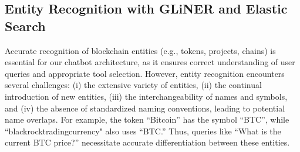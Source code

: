 \documentclass[runningheads]{llncs}
\begin{document}



\subsection{Entity Recognition with GLiNER and Elastic Search}

Accurate recognition of blockchain entities (e.g., tokens, projects, chains) is essential for our chatbot architecture, as it ensures correct understanding of user queries and appropriate tool selection. However, entity recognition encounters several challenges: (i) the extensive variety of entities, (ii) the continual introduction of new entities, (iii) the interchangeability of names and symbols, and (iv) the absence of standardized naming conventions, leading to potential name overlaps. For example, the token ``Bitcoin'' has the symbol ``BTC'', while ``blackrocktradingcurrency" also uses ``BTC.'' Thus, queries like ``What is the current BTC price?'' necessitate accurate differentiation between these entities.
\end{document}
